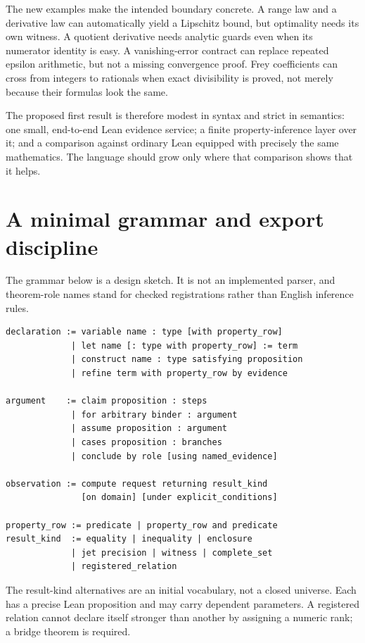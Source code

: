 \documentclass[11pt,a4paper]{article}
\theoremstyle{definition}
\theoremstyle{remark}
\begin{document}
The new examples make the intended boundary concrete. A range law and a derivative law can automatically yield a Lipschitz bound, but optimality needs its own witness. A quotient derivative needs analytic guards even when its numerator identity is easy. A vanishing-error contract can replace repeated epsilon arithmetic, but not a missing convergence proof. Frey coefficients can cross from integers to rationals when exact divisibility is proved, not merely because their formulas look the same.

The proposed first result is therefore modest in syntax and strict in semantics: one small, end-to-end Lean evidence service; a finite property-inference layer over it; and a comparison against ordinary Lean equipped with precisely the same mathematics. The language should grow only where that comparison shows that it helps.

\appendix
\section{A minimal grammar and export discipline}
\label{app:grammar}

The grammar below is a design sketch. It is not an implemented parser, and theorem-role names stand for checked registrations rather than English inference rules.
\begin{lstlisting}
declaration := variable name : type [with property_row]
             | let name [: type with property_row] := term
             | construct name : type satisfying proposition
             | refine term with property_row by evidence

argument    := claim proposition : steps
             | for arbitrary binder : argument
             | assume proposition : argument
             | cases proposition : branches
             | conclude by role [using named_evidence]

observation := compute request returning result_kind
               [on domain] [under explicit_conditions]

property_row := predicate | property_row and predicate
result_kind  := equality | inequality | enclosure
             | jet precision | witness | complete_set
             | registered_relation
\end{lstlisting}

The result-kind alternatives are an initial vocabulary, not a closed universe. Each has a precise Lean proposition and may carry dependent parameters. A registered relation cannot declare itself stronger than another by assigning a numeric rank; a bridge theorem is required.
\end{document}

